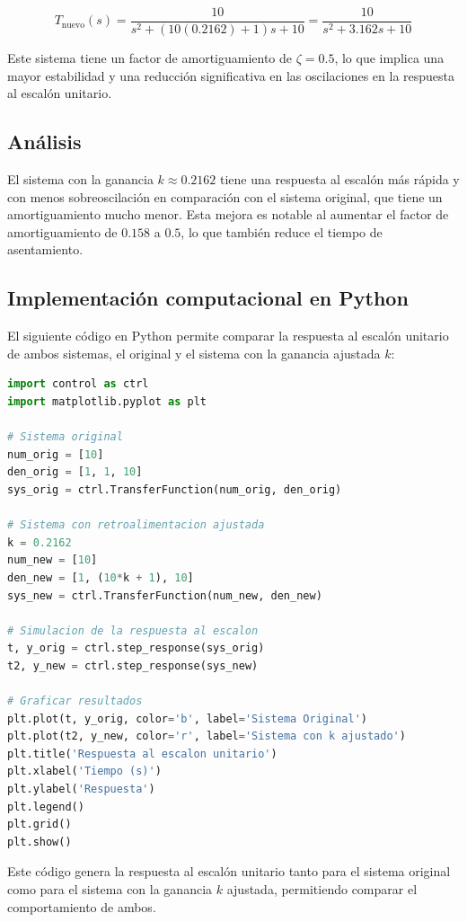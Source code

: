 \documentclass[10pt]{article}
\theoremstyle{definition}
\theoremstyle{remark}
\theoremstyle{definition}
\numberwithin{equation}{prob}
\begin{document}
\[
T_{\text{nuevo}}(s) = \frac{10}{s^2 + (10(0.2162) + 1)s + 10} = \frac{10}{s^2 + 3.162s + 10}
\]

Este sistema tiene un factor de amortiguamiento de \( \zeta = 0.5 \), lo que implica una mayor estabilidad y una reducción significativa en las oscilaciones en la respuesta al escalón unitario.

\subsection*{Análisis}

El sistema con la ganancia \( k \approx 0.2162 \) tiene una respuesta al escalón más rápida y con menos sobreoscilación en comparación con el sistema original, que tiene un amortiguamiento mucho menor. Esta mejora es notable al aumentar el factor de amortiguamiento de \( 0.158 \) a \( 0.5 \), lo que también reduce el tiempo de asentamiento.

\subsection*{Implementación computacional en Python}

El siguiente código en Python permite comparar la respuesta al escalón unitario de ambos sistemas, el original y el sistema con la ganancia ajustada \( k \):

\begin{lstlisting}[language=Python]
import control as ctrl
import matplotlib.pyplot as plt

# Sistema original
num_orig = [10]
den_orig = [1, 1, 10]
sys_orig = ctrl.TransferFunction(num_orig, den_orig)

# Sistema con retroalimentacion ajustada
k = 0.2162
num_new = [10]
den_new = [1, (10*k + 1), 10]
sys_new = ctrl.TransferFunction(num_new, den_new)

# Simulacion de la respuesta al escalon
t, y_orig = ctrl.step_response(sys_orig)
t2, y_new = ctrl.step_response(sys_new)

# Graficar resultados
plt.plot(t, y_orig, color='b', label='Sistema Original')
plt.plot(t2, y_new, color='r', label='Sistema con k ajustado')
plt.title('Respuesta al escalon unitario')
plt.xlabel('Tiempo (s)')
plt.ylabel('Respuesta')
plt.legend()
plt.grid()
plt.show()
\end{lstlisting}

Este código genera la respuesta al escalón unitario tanto para el sistema original como para el sistema con la ganancia \( k \) ajustada, permitiendo comparar el comportamiento de ambos.
\end{document}
